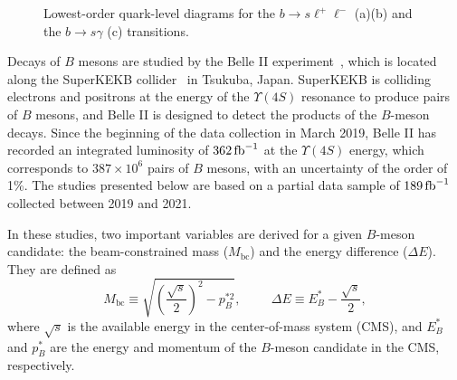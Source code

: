 \documentclass{moriond}
\def\Mbc{\ensuremath{M_{\mathrm{bc}}}\xspace}
\def\dE{\ensuremath{\Delta E}\xspace}
\def\ufours{\ensuremath{\Upsilon(4S)}\xspace}
\def\invfb{\ensuremath{\mbox{\,fb}^{-1}}\xspace}
\begin{document}
\begin{figure}[b]
\centering
{}
\caption{Lowest-order quark-level diagrams for the $b\to s \ell^+\ell^-$ (a)(b) and the $b \to s\gamma$ (c) transitions.}
\label{fig:feynman}
\end{figure}

Decays of $B$ mesons are studied by the Belle II experiment~\cite{Abe:2010gxa}, which is located along the SuperKEKB collider~\cite{AKAI2018188} in Tsukuba, Japan.
SuperKEKB is colliding electrons and positrons at the energy of the \ufours resonance to produce pairs of $B$ mesons, and Belle II is designed to detect the products of the $B$-meson decays.
Since the beginning of the data collection in March 2019, Belle II has recorded an integrated luminosity of $362\invfb$ at the \ufours energy, which corresponds to $387\times10^6$ pairs of $B$ mesons, with an uncertainty of the order of 1\%.
The studies presented below are based on a partial data sample of $189\invfb$ collected between 2019 and 2021.

In these studies, two important variables are derived for a given $B$-meson candidate: the beam-constrained mass (\Mbc) and the energy difference (\dE).
They are defined as
\begin{equation}\label{eq:mbc_de}
    \Mbc \equiv \sqrt{\left(\frac{\sqrt{s}}{2}\right)^2 - p^{\ast 2}_B},
    \hspace{1cm}\Delta E \equiv E^\ast_B - \frac{\sqrt{s}}{2},
\end{equation}
where $\sqrt{s}$ is the available energy in the center-of-mass system (CMS), and $E^\ast_B$ and $p^{\ast}_B$ are the energy and momentum of the $B$-meson candidate in the CMS, respectively.
\end{document}
